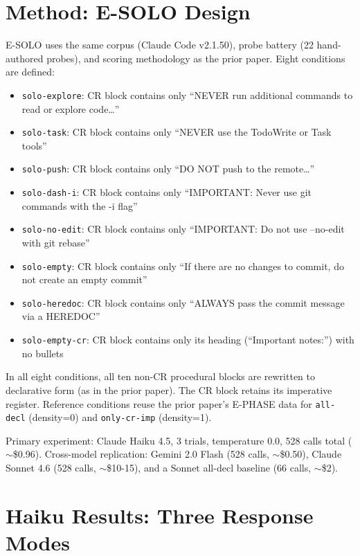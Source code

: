 \documentclass[11pt,a4paper]{article}
\begin{document}
\section{Method: E-SOLO Design}
\label{sec:method}

E-SOLO uses the same corpus (Claude Code v2.1.50), probe battery
(22 hand-authored probes), and scoring methodology as the prior
paper. Eight conditions are defined:

\begin{itemize}[leftmargin=*, itemsep=1pt]
\item \texttt{solo-explore}: CR block contains only ``NEVER run
additional commands to read or explore code\ldots''
\item \texttt{solo-task}: CR block contains only ``NEVER use the
TodoWrite or Task tools''
\item \texttt{solo-push}: CR block contains only ``DO NOT push
to the remote\ldots''
\item \texttt{solo-dash-i}: CR block contains only ``IMPORTANT:
Never use git commands with the -i flag''
\item \texttt{solo-no-edit}: CR block contains only ``IMPORTANT:
Do not use --no-edit with git rebase''
\item \texttt{solo-empty}: CR block contains only ``If there are
no changes to commit, do not create an empty commit''
\item \texttt{solo-heredoc}: CR block contains only ``ALWAYS pass
the commit message via a HEREDOC''
\item \texttt{solo-empty-cr}: CR block contains only its heading
(``Important notes:'') with no bullets
\end{itemize}

In all eight conditions, all ten non-CR procedural blocks are
rewritten to declarative form (as in the prior paper). The CR
block retains its imperative register. Reference conditions
reuse the prior paper's E-PHASE data for
\texttt{all-decl} (density=0) and \texttt{only-cr-imp} (density=1).

Primary experiment: Claude Haiku 4.5, 3 trials, temperature 0.0,
528 calls total ($\sim$\$0.96). Cross-model replication:
Gemini 2.0 Flash (528 calls, $\sim$\$0.50), Claude Sonnet 4.6
(528 calls, $\sim$\$10-15), and a Sonnet all-decl baseline
(66 calls, $\sim$\$2).

\section{Haiku Results: Three Response Modes}
\label{sec:haiku}
\end{document}
